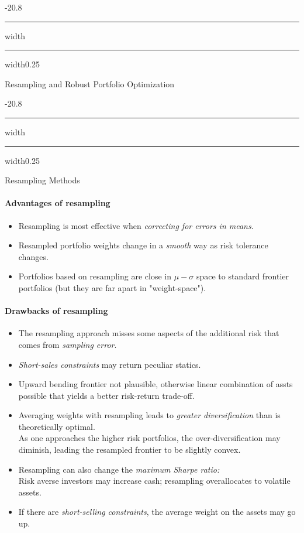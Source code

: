 \documentclass[a4paper,landscape,8pt,fleqn]{scrartcl}
\makeatletter
\renewcommand{\section}{\@startsection{section}{1}{0mm}%
{-2\baselineskip}{0.8\baselineskip}%
{\hrule depth 0.2pt width\columnwidth\hrule depth1.5pt
width0.25\columnwidth\vspace*{1.2em}\Large\bfseries}}
\renewcommand{\subsection}{\@startsection{subsection}{1}{0mm}%
{-2\baselineskip}{0.8\baselineskip}%
{\hrule depth 0.2pt width\columnwidth\hrule depth0.75pt
width0.25\columnwidth\vspace*{1.2em}\large\bfseries}}
\makeatother
\begin{document}
\begin{multicols*}{3}
\section{Resampling and Robust Portfolio Optimization}

\subsection{Resampling Methods}

\paragraph{Advantages of resampling}
\begin{itemize}
\item Resampling is most effective when \textit{correcting for errors in means}.
\item Resampled portfolio weights change in a \textit{smooth} way as risk tolerance changes.
\item Portfolios based on resampling are close in $\mu-\sigma$ space to standard frontier portfolios (but they are far apart in "weight-space").
\end{itemize}

\paragraph{Drawbacks of resampling}
\begin{itemize}
\item The resampling approach misses some aspects of the additional risk that comes from \textit{sampling error}.
\item \textit{Short-sales constraints} may return peculiar statics.
\item Upward bending frontier not plausible, otherwise linear combination of assts possible that yields a better risk-return trade-off.
\item Averaging weights with resampling leads to \textit{greater diversification} than is theoretically optimal. \\
As one approaches the higher risk portfolios, the over-diversification may diminish, leading the resampled frontier to be slightly convex.
\item Resampling can also change the \textit{maximum Sharpe ratio:} \\
Risk averse investors may increase cash; resampling overallocates to volatile assets.
\item If there are \textit{short-selling constraints}, the average weight on the assets may go up.
\end{itemize}


\end{multicols*}
\end{document}
